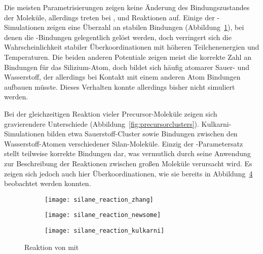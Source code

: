 Die meisten Parametrisierungen zeigen keine Änderung des Bindungszustandes der Moleküle, allerdings treten bei ,  und  Reaktionen auf.
Einige der -Simulationen zeigen eine Überzahl an stabilen Bindungen (Abbildung~\ref{fig:zhangreaction}), bei denen die -Bindungen gelegentlich gelöst werden, doch verringert sich die Wahrscheinlichkeit stabiler Überkoordinationen mit höheren Teilchenenergien und Temperaturen.
Die beiden anderen Potentiale zeigen meist die korrekte Zahl an Bindungen für das Silizium-Atom, doch bildet sich häufig atomarer Sauer- und Wasserstoff, der allerdings bei Kontakt mit einem anderen Atom Bindungen aufbauen müsste.
Dieses Verhalten konnte allerdings bisher nicht simuliert werden.

Bei der gleichzeitigen Reaktion vieler Precursor-Moleküle zeigen sich gravierendere Unterschiede (Abbildung~\ref{fig:precursorclusters}).
Kulkarni-Simulationen bilden etwa Sauerstoff-Cluster sowie Bindungen zwischen den Wasserstoff-Atomen verschiedener Silan-Moleküle.
Einzig der -Parametersatz stellt teilweise korrekte Bindungen dar, was vermutlich durch seine Anwendung zur Beschreibung der Reaktionen zwischen großen Moleküle verursacht wird.
Es zeigen sich jedoch auch hier Überkoordinationen, wie sie bereits in Abbildung~\ref{fig:precursorreactions} beobachtet werden konnten.

\begin{figure}[p]

  \captionsetup[subfigure]{singlelinecheck=false}
  \def\subfigwidth{0.32\textwidth}
  \begin{subfigure}[t]{3cm}
    \texttt{[image: silane\_reaction\_zhang]}
    \label{fig:zhangreaction}
  \end{subfigure}
  \hfill
  \begin{subfigure}[t]{5cm}
    \texttt{[image: silane\_reaction\_newsome]}
    \label{fig:newsomereaction}
  \end{subfigure}
  \hfill
  \begin{subfigure}[t]{4.5cm}
    \texttt{[image: silane\_reaction\_kulkarni]}
    \label{fig:kulkarnireaction}
  \end{subfigure}

  \caption[Reaktionen von  mit ]{
    Reaktion von  mit 
  }
  \label{fig:precursorreactions}

\end{figure}

